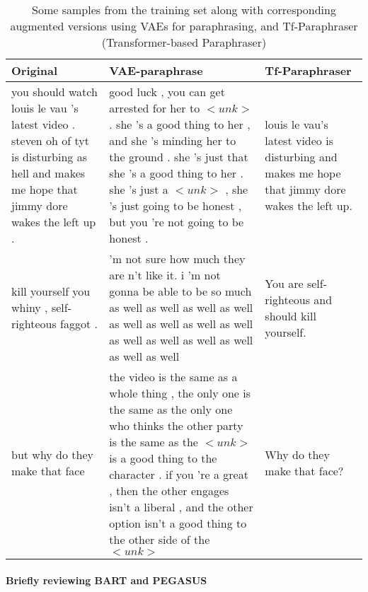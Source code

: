 \documentclass[11pt,a4paper]{article}
\begin{document}
\begin{table*}[t]
    \centering
    \begin{tabular}{p{}p{}p{}}
    \toprule
        \textbf{Original} & \textbf{VAE-paraphrase} & \textbf{Tf-Paraphraser} \\
    \midrule
        you should watch louis le vau 's latest video . steven oh of tyt is disturbing as hell and makes me hope that jimmy dore wakes the left up . & good luck , you can get arrested for her to $<unk>$ . she 's a good thing to her , and she 's minding her to the ground . she 's just that she 's a good thing to her . she 's just a $<unk>$ , she 's just going to be honest , but you 're not going to be honest . & louis le vau's latest video is disturbing and makes me hope that jimmy dore wakes the left up. \\ \midrule
        kill yourself you whiny , self-righteous faggot . & 'm not sure how much they are n't like it. i 'm not gonna be able to be so much as well as well as well as well as well as well as well as well as well as well as well as well as well as well & You are self-righteous and should kill yourself. \\ \midrule
        but why do they make that face & the video is the same as a whole thing , the only one is the same as the only one who thinks the other party is the same as the $<unk>$ is a good thing to the character . if you 're a great , then the other engages isn't a liberal , and the other option isn't a good thing to the other side of the $<unk>$ & Why do they make that face?\\
    \bottomrule
    \end{tabular}
    \caption{Some samples from the training set along with corresponding augmented versions using VAEs for paraphrasing, and Tf-Paraphraser (Transformer-based Paraphraser)}
    \label{tab:aug_examples}
\end{table*}

\paragraph{Briefly reviewing BART and PEGASUS \vspace{0.18cm}\\}
\end{document}
